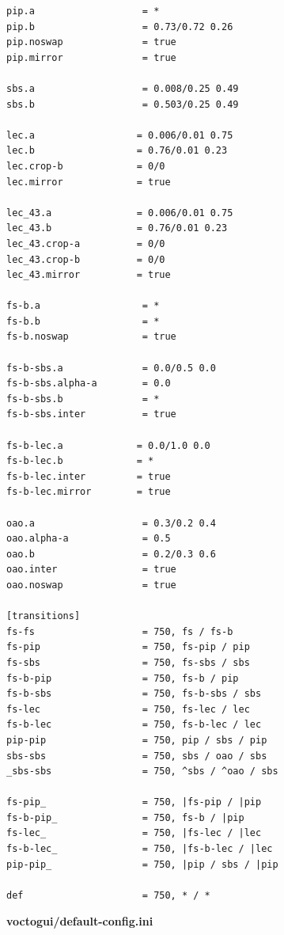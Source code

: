 \begin{lstlisting}[style=inifile]
pip.a                   = *
pip.b                   = 0.73/0.72 0.26
pip.noswap              = true
pip.mirror              = true

sbs.a                   = 0.008/0.25 0.49
sbs.b                   = 0.503/0.25 0.49

lec.a                  = 0.006/0.01 0.75
lec.b                  = 0.76/0.01 0.23
lec.crop-b             = 0/0
lec.mirror             = true

lec_43.a               = 0.006/0.01 0.75
lec_43.b               = 0.76/0.01 0.23
lec_43.crop-a          = 0/0
lec_43.crop-b          = 0/0
lec_43.mirror          = true

fs-b.a                  = *
fs-b.b                  = *
fs-b.noswap             = true

fs-b-sbs.a              = 0.0/0.5 0.0
fs-b-sbs.alpha-a        = 0.0
fs-b-sbs.b              = *
fs-b-sbs.inter          = true

fs-b-lec.a             = 0.0/1.0 0.0
fs-b-lec.b             = *
fs-b-lec.inter         = true
fs-b-lec.mirror        = true

oao.a                   = 0.3/0.2 0.4
oao.alpha-a             = 0.5
oao.b                   = 0.2/0.3 0.6
oao.inter               = true
oao.noswap              = true

[transitions]
fs-fs                   = 750, fs / fs-b
fs-pip                  = 750, fs-pip / pip
fs-sbs                  = 750, fs-sbs / sbs
fs-b-pip                = 750, fs-b / pip
fs-b-sbs                = 750, fs-b-sbs / sbs
fs-lec                  = 750, fs-lec / lec
fs-b-lec                = 750, fs-b-lec / lec
pip-pip                 = 750, pip / sbs / pip
sbs-sbs                 = 750, sbs / oao / sbs
_sbs-sbs                = 750, ^sbs / ^oao / sbs

fs-pip_                 = 750, |fs-pip / |pip
fs-b-pip_               = 750, fs-b / |pip
fs-lec_                 = 750, |fs-lec / |lec
fs-b-lec_               = 750, |fs-b-lec / |lec
pip-pip_                = 750, |pip / sbs / |pip

def                     = 750, * / *
\end{lstlisting}

\clearpage
\vspace{0.3cm}
\noindent\textbf{\small voctogui/default-config.ini}
\vspace{0.1cm}

